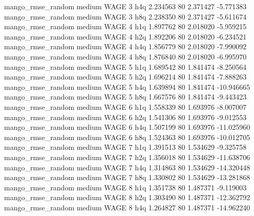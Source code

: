 mango_rmse_random     medium     WAGE                 3                  h4q  2.234563 80       2.371427          -5.771383
mango_rmse_random     medium     WAGE                 3                  h8q  2.238350 80       2.371427          -5.611674
mango_rmse_random     medium     WAGE                 4                  h1q  1.897762 80       2.018020          -5.959215
mango_rmse_random     medium     WAGE                 4                  h2q  1.892206 80       2.018020          -6.234521
mango_rmse_random     medium     WAGE                 4                  h4q  1.856779 80       2.018020          -7.990092
mango_rmse_random     medium     WAGE                 4                  h8q  1.876840 80       2.018020          -6.995970
mango_rmse_random     medium     WAGE                 5                  h1q  1.689542 80       1.841474          -8.250564
mango_rmse_random     medium     WAGE                 5                  h2q  1.696214 80       1.841474          -7.888263
mango_rmse_random     medium     WAGE                 5                  h4q  1.639894 80       1.841474         -10.946665
mango_rmse_random     medium     WAGE                 5                  h8q  1.667576 80       1.841474          -9.443423
mango_rmse_random     medium     WAGE                 6                  h1q  1.558339 80       1.693976          -8.007007
mango_rmse_random     medium     WAGE                 6                  h2q  1.541306 80       1.693976          -9.012553
mango_rmse_random     medium     WAGE                 6                  h4q  1.507199 80       1.693976         -11.025960
mango_rmse_random     medium     WAGE                 6                  h8q  1.524363 80       1.693976         -10.012705
mango_rmse_random     medium     WAGE                 7                  h1q  1.391513 80       1.534629          -9.325758
mango_rmse_random     medium     WAGE                 7                  h2q  1.356018 80       1.534629         -11.638706
mango_rmse_random     medium     WAGE                 7                  h4q  1.314863 80       1.534629         -14.320448
mango_rmse_random     medium     WAGE                 7                  h8q  1.330802 80       1.534629         -13.281868
mango_rmse_random     medium     WAGE                 8                  h1q  1.351738 80       1.487371          -9.119003
mango_rmse_random     medium     WAGE                 8                  h2q  1.303490 80       1.487371         -12.362792
mango_rmse_random     medium     WAGE                 8                  h4q  1.264827 80       1.487371         -14.962240
